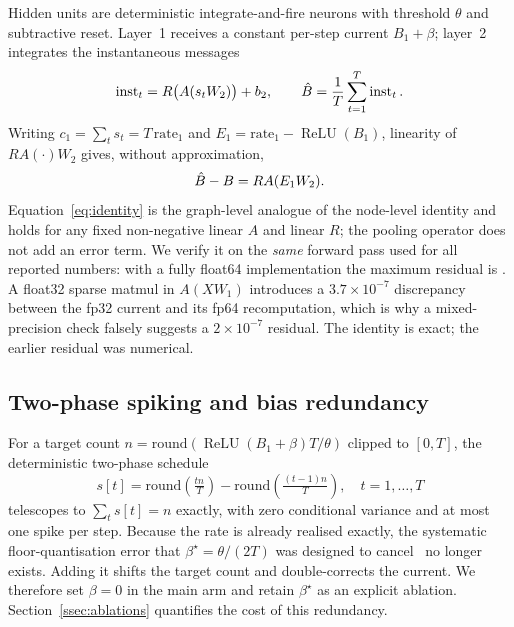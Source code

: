 Hidden units are deterministic integrate-and-fire neurons with threshold $\theta$ and subtractive reset. Layer~1 receives a constant per-step current $B_1+\beta$; layer~2 integrates the instantaneous messages
\begin{equation}
\operatorname{inst}_t = R\big(A (s_t W_2)\big) + b_2,\qquad
\hat{B} = \frac{1}{T}\sum_{t=1}^{T} \operatorname{inst}_t .
\label{eq:convert}
\end{equation}
Writing $c_1=\sum_t s_t = T\,\mathrm{rate}_1$ and $E_1=\mathrm{rate}_1-\operatorname{ReLU}(B_1)$, linearity of $R A (\cdot) W_2$ gives, without approximation,
\begin{equation}
\hat{B} - B = R A (E_1 W_2).
\label{eq:identity}
\end{equation}
Equation~\eqref{eq:identity} is the graph-level analogue of the node-level identity and holds for any fixed non-negative linear $A$ and linear $R$; the pooling operator does not add an error term. We verify it on the \emph{same} forward pass used for all reported numbers: with a fully float64 implementation the maximum residual is \IdentityMax. A float32 sparse matmul in $A(XW_1)$ introduces a $3.7\times10^{-7}$ discrepancy between the fp32 current and its fp64 recomputation, which is why a mixed-precision check falsely suggests a $2\times10^{-7}$ residual. The identity is exact; the earlier residual was numerical.

\subsection{Two-phase spiking and bias redundancy}
\label{ssec:twophase}

For a target count $n=\mathrm{round}(\operatorname{ReLU}(B_1+\beta)T/\theta)$ clipped to $[0,T]$, the deterministic two-phase schedule
\begin{equation}
s[t] = \mathrm{round}\!\left(\tfrac{t n}{T}\right) - \mathrm{round}\!\left(\tfrac{(t-1)n}{T}\right),\quad t=1,\dots,T
\label{eq:dtp}
\end{equation}
telescopes to $\sum_t s[t]=n$ exactly, with zero conditional variance and at most one spike per step. Because the rate is already realised exactly, the systematic floor-quantisation error that $\beta^\star=\theta/(2T)$ was designed to cancel~\cite{deng2021,wu2024ftbc} no longer exists. Adding it shifts the target count and double-corrects the current. We therefore set $\beta=0$ in the main arm and retain $\beta^\star$ as an explicit ablation. Section~\ref{ssec:ablations} quantifies the cost of this redundancy.

